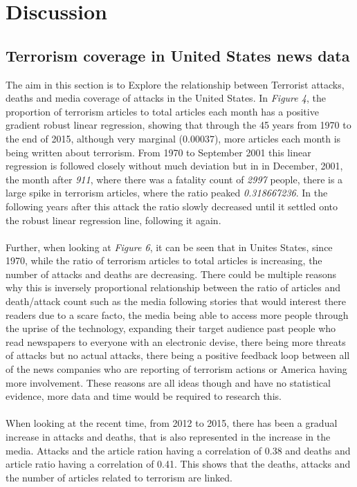 \documentclass[10pt,a4paper]{article}
\begin{document}
\section{Discussion} 

\subsection{Terrorism coverage in United States news data}
The aim in this section is to Explore the relationship between Terrorist attacks, deaths and media coverage of attacks in the United States. In \textit{Figure 4}, the proportion of terrorism articles to total articles each month has a positive gradient robust linear regression, showing that through the 45 years from 1970 to the end of 2015, although very marginal (0.00037), more articles each month is being written about terrorism. From 1970 to September 2001 this linear regression is followed closely without much deviation but in in December, 2001, the month after \textit{911}, where there was a fatality count of \textit{2997} people, there is a large spike in terrorism articles, where the ratio peaked \textit{0.318667236}. In the following years after this attack the ratio slowly decreased until it settled onto the robust linear regression line, following it again.
\\\\
Further, when looking at \textit{Figure 6}, it can be seen that in Unites States, since 1970, while the ratio of terrorism articles to total articles is increasing, the number of attacks and deaths are decreasing. There could be multiple reasons why this is inversely proportional relationship between the ratio of articles and death/attack count such as the media following stories that would interest there readers due to a scare facto, the media being able to access more people through the uprise of the technology, expanding their target audience past people who read newspapers to everyone with an electronic devise, there being more threats of attacks but no actual attacks, there being a positive feedback loop between all of the news companies who are reporting of terrorism actions or America having more involvement. These reasons are all ideas though and have no statistical evidence, more data and time would be required to research this.
\\\\
When looking at the recent time, from 2012 to 2015, there has been a gradual increase in attacks and deaths, that is also represented in the increase in the media. Attacks and the article ration having a correlation of 0.38 and deaths and article ratio having a correlation of 0.41. This shows that the deaths, attacks and the number of articles related to terrorism are linked.
\end{document}
